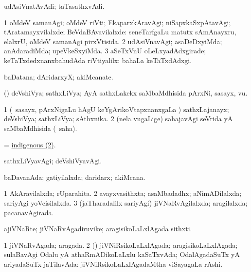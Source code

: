 \bentry
{}
\gl{\nA}
\bmng
udAsiVnatAvAdi; taTasathxvAdi. 
\emng
\eentry

\bentry
{}
\gl{\kirxvi}
\bmng
\bnum
\num{1} oMdeV samanAgi; oMdeV riVti; EkaparxkAravAgi; niSapxkaSxpAtavAgi; tAratamayxvilalxde; BeVdaBAvavilalxde:  seneTarfgaLu matutx sAmAnayxru, elalxrU, oMdeV samanAgi pirxVtisida. 
\num{2} udAsiVnavAgi; asaDeDxyiMda; anAdaradiMda; upeVkeSxyiMda. 
\num{3} aSeTxVnU oLeLxyadAdxgirade; keTaTxdedxnanxbahudAda riVtiyalilx:  bahaLa keTaTxdAdxgi. 
\enum
\emng
\eentry

\bentry
{}
\gl{\nA}
\bmng
baDatana; dAridarxyX; akiMcanate. 
\emng
\eentry

\bentry
{}
\gl{\nA}
\bmng
(\pArxparx) deVshiVya; sathxLiVya; AyA sathxLakekx saMbaMdhisida pArxNi, sasayx, \mo vu. 
\emng
\eentry

\bentry
{}
\gl{\gu}
\bmng
\bnum
\num{1} (\kanmu\ sasayx, pArxNigaLu hAgU keYgArikoVtapxnanxgaLa \vi) sathxLajanayx; deVshiVya; sathxLiVya; sAthxnika. 
\hypertarget{indigenous(2)}{} 
\num{2} (nela \mo vugaLige) sahajavAgi seVrida yA saMbaMdhisida (\rUpa\ saha). 
\enum
\emng

\noindent
\gl{\pagu}
\bmng
{} = \hyperlink{indigenous(2)}{indigenous (2)}. 
\emng
\eentry

\bentry
{}
\gl{\kirxvi}
\bmng
sathxLiVyavAgi; deVshiVyavAgi. 
\emng
\eentry

\bentry
{}
\gl{\gu}
\bmng
baDavanAda; gatiyilalxda; daridarx; akiMcana. 
\emng
\eentry

\bentry
{}
\gl{\gu}
\bmng
\bnum
\num{1} AkAravilalxda; rUparahita. 
\num{2} avayxvasithxta; asaMbadadhx; aNimADilalxda; sariyAgi yoVcisilalxda. 
\num{3} (jaTharadalilx sariyAgi) jiVNaRvAgilalxda; aragilalxda; pacanavAgirada. 
\enum
\emng
\eentry

\bentry
{}
\gl{\nA}
\bmng
ajiVNaRte; jiVNaRvAgadiruvike; aragisikoLaLxlAgada sithxti. 
\emng
\eentry

\bentry
{}
\gl{\gu}
\bmng
\bnum
\num{1} jiVNaRvAgada; aragada. 
\num{2} (\rUpa) jiVNiRsikoLaLxlAgada; aragisikoLaLxlAgada; sulaBavAgi Odalu yA athaRmADikoLaLxlu kaSaTxvAda; OdalAgadaSuTx yA ariyadaSuTx jaTilavAda:  jiVNiRsikoLaLxlAgadaMtha viSayagaLa rAshi. 
\enum
\emng
\eentry

